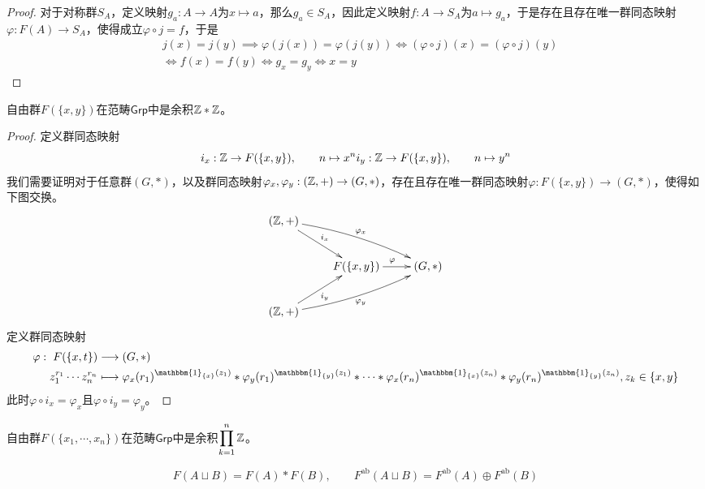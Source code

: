 \begin{proof}
	对于对称群$S_A$，定义映射$g_a:A\to A$为$x\mapsto a$，那么$g_a\in S_A$，因此定义映射$f:A\to S_A$为$a\mapsto g_a$，于是存在且存在唯一群同态映射$\varphi:F(A)\to S_A$，使得成立$\varphi\circ j=f$，于是
	\begin{align*}
		&j(x)=j(y)
		\implies \varphi(j(x))=\varphi(j(y))
		\iff (\varphi\circ j)(x)=(\varphi\circ j)(y)\\
		&\iff f(x)=f(y)
		\iff g_x=g_y
		\iff x=y
	\end{align*}
\end{proof}

\begin{proposition}
	自由群$F(\{x,y\})$在范畴$\mathsf{Grp}$中是余积$\mathbb{Z} *\mathbb{Z}$。
\end{proposition}

\begin{proof}
	定义群同态映射
	$$
	i_x:\mathbb{Z}\to F(\{x,y\}),\qquad n\mapsto x^n\\
	i_y:\mathbb{Z}\to F(\{x,y\}),\qquad n\mapsto y^n
	$$
	我们需要证明对于任意群$(G,*)$，以及群同态映射$\varphi_x,\varphi_y:(\mathbb{Z},+)\to (G,*)$，存在且存在唯一群同态映射$\varphi:F(\{x,y\})\to (G,*)$，使得如下图交换。
	$$
	\xymatrix{
		(\Z,+) \ar[dr]^{i_x} \ar@/^/[drr]^{\varphi_x} & & \\
		& F(\{x,y\}) \ar[r]^\varphi & (G,*) \\
		(\Z,+) \ar[ur]_{i_y} \ar@/_/[urr]_{\varphi_y} & & \\
	}
	$$
	定义群同态映射
	\begin{align*}
		\varphi:\begin{aligned}[t]
			F(\{x,t\})&\longrightarrow (G,*)\\
			z_1^{r_1}\cdots z_n^{r_n}&\longmapsto 
			\varphi_x(r_1)^{\mathbbm{1}_{\{x\}}(z_1)}*
			\varphi_y(r_1)^{\mathbbm{1}_{\{y\}}(z_1)}*\cdots*
			\varphi_x(r_n)^{\mathbbm{1}_{\{x\}}(z_n)}*
			\varphi_y(r_n)^{\mathbbm{1}_{\{y\}}(z_n)},z_k\in\{x,y\}
		\end{aligned}
	\end{align*}
	此时$\varphi\circ i_x=\varphi_x$且$\varphi\circ i_y=\varphi_y$。
\end{proof}

\begin{proposition}
	自由群$F(\{x_1,\cdots,x_n\})$在范畴$\mathsf{Grp}$中是余积$\displaystyle\prod_{k=1}^{n}\mathbb{Z}$。
\end{proposition}

\begin{proposition}
	$$
	F(A\sqcup B)=F(A)*F(B),\qquad 
	F^{\mathrm{ab}}(A\sqcup B)=F^{\mathrm{ab}}(A)\oplus F^{\mathrm{ab}}(B)
	$$
\end{proposition}

